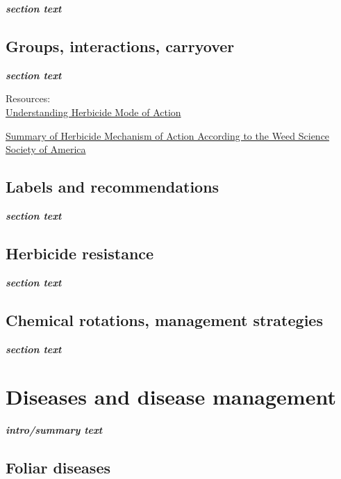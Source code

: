 \documentclass[
  letterpaper,
  DIV=11,
  numbers=noendperiod]{scrreprt}
\begin{document}
\textbf{\emph{section text}}

\section{Groups, interactions,
carryover}\label{groups-interactions-carryover}

\textbf{\emph{section text}}

Resources:\\
\href{https://extension.okstate.edu/fact-sheets/print-publications/pss/herbicide-how-to-understanding-herbicide-mode-of-action-pss-2778.pdf}{Understanding
Herbicide Mode of Action}

\href{https://wssa.net/wp-content/uploads/WSSA-Mechanism-of-Action.pdf}{Summary
of Herbicide Mechanism of Action According to the Weed Science Society
of America}

\section{Labels and recommendations}\label{labels-and-recommendations}

\textbf{\emph{section text}}

\section{Herbicide resistance}\label{herbicide-resistance}

\textbf{\emph{section text}}

\section{Chemical rotations, management
strategies}\label{chemical-rotations-management-strategies}

\textbf{\emph{section text}}


\chapter{Diseases and disease
management}\label{diseases-and-disease-management}

\textbf{\emph{intro/summary text}}

\section{Foliar diseases}\label{foliar-diseases}
\end{document}
